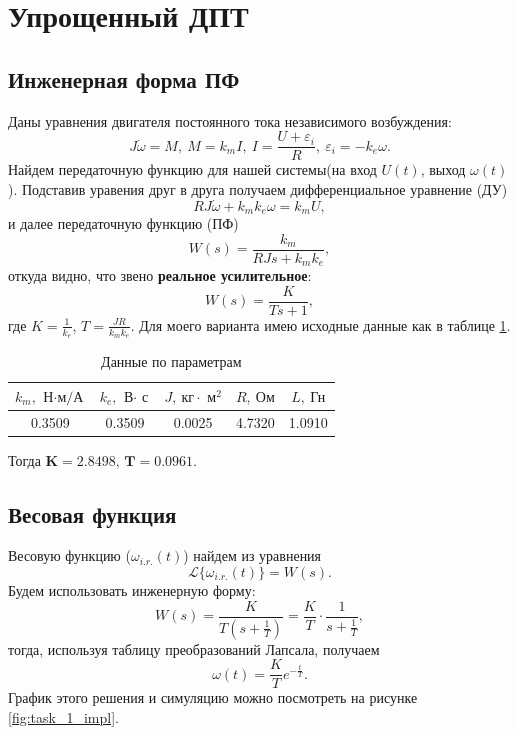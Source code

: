 \section{Упрощенный ДПТ}

\subsection{Инженерная форма ПФ}

Даны уравнения двигателя постоянного тока независимого возбуждения:
\begin{equation*}
    J\dot\omega=M,\ M=k_mI,\ I=\frac{U+\varepsilon_i}{R},\ \varepsilon_i=-k_e\omega. 
\end{equation*}
Найдем передаточную функцию для нашей системы(на вход $U(t)$, выход $\omega(t)$).
Подставив уравения друг в друга получаем дифференциальное уравнение (ДУ)
\begin{equation*}
    RJ\dot\omega+k_mk_e\omega=k_mU,
\end{equation*}
и далее передаточную функцию (ПФ)
\begin{equation*}
    W(s)=\frac{k_m}{RJs+k_mk_e},
\end{equation*}
откуда видно, что звено \textbf{реальное усилительное}:
\begin{equation*}
    W(s)=\frac{K}{Ts+1},
\end{equation*}
где $K=\frac{1}{k_e}$, $T=\frac{JR}{k_mk_e}$. Для моего варианта имею исходные данные
как в таблице \ref{tab:obj1}.
\begin{table}[H]
    \centering
    \begin{tabular}{|c|c|c|c|c|}
        \hline
        \( k_m,\ \text{Н$\cdot$м/А} \) & \( k_e,\ \text{В$\cdot$ с} \) & \( J,\ \text{кг$\cdot$ м$^2$} \) & \( R,\ \text{Ом} \) & \( L,\ \text{Гн} \) \\ 
        \hline
         0.3509  &  0.3509 &  0.0025  &  4.7320 & 1.0910 \\ 
        \hline
    \end{tabular}
    \label{tab:obj1}
    \caption{Данные по параметрам}
\end{table}
\noindent Тогда $\boldsymbol{K=2.8498}$, $\boldsymbol{T=0.0961}$.


\subsection{Весовая функция}

Весовую функцию ($\omega_{i.r.}(t)$) найдем из уравнения
\[
    \mathcal{L}\{\omega_{i.r.}(t)\} = W(s).
\]
Будем использовать инженерную форму:
\[
W(s)  = \frac{K}{T(s+\frac{1}{T})}= \frac{K}{T}\cdot\frac{1}{s+\frac{1}{T}},
\]
тогда, используя таблицу преобразований Лапсала, получаем
\[
\omega(t)= \frac{K}{T}e^{-\frac{t}{T}}.
\]
График этого решения и симуляцию можно посмотреть на рисунке \ref{fig:task_1_impl}.

